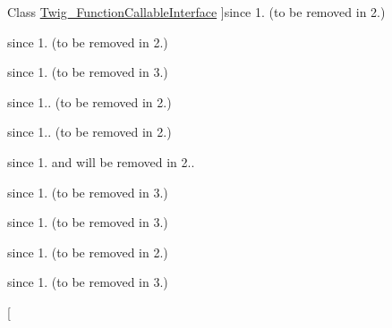 \begin{DoxyRefList}
Class \hyperlink{interfaceTwig__FunctionCallableInterface}{Twig\+\_\+\+Function\+Callable\+Interface} ]since 1. (to be removed in 2.)  
\item[\label{deprecated__deprecated000028}%
\hypertarget{deprecated__deprecated000028}{}%
Class \hyperlink{interfaceTwig__FunctionInterface}{Twig\+\_\+\+Function\+Interface} ]since 1. (to be removed in 2.)  
\item[\label{deprecated__deprecated000029}%
\hypertarget{deprecated__deprecated000029}{}%
Class \hyperlink{interfaceTwig__LexerInterface}{Twig\+\_\+\+Lexer\+Interface} ]since 1. (to be removed in 3.)  
\item[\label{deprecated__deprecated000030}%
\hypertarget{deprecated__deprecated000030}{}%
Class \hyperlink{classTwig__Loader__String}{Twig\+\_\+\+Loader\+\_\+\+String} ]since 1.. (to be removed in 2.) 
\item[\label{deprecated__deprecated000032}%
\hypertarget{deprecated__deprecated000032}{}%
Member \hyperlink{classTwig__Node_ae67364ef0be505ea43a05f6c80e1c7c6}{Twig\+\_\+\+Node\+:\+:to\+Xml} (\$as\+Dom=false)]since 1.. (to be removed in 2.)  
\item[\label{deprecated__deprecated000031}%
\hypertarget{deprecated__deprecated000031}{}%
Class \hyperlink{classTwig__Node__Expression__ExtensionReference}{Twig\+\_\+\+Node\+\_\+\+Expression\+\_\+\+Extension\+Reference} ]since 1. and will be removed in 2..  
\item[\label{deprecated__deprecated000033}%
\hypertarget{deprecated__deprecated000033}{}%
Class \hyperlink{interfaceTwig__NodeInterface}{Twig\+\_\+\+Node\+Interface} ]since 1. (to be removed in 3.)  
\item[\label{deprecated__deprecated000034}%
\hypertarget{deprecated__deprecated000034}{}%
Class \hyperlink{interfaceTwig__ParserInterface}{Twig\+\_\+\+Parser\+Interface} ]since 1. (to be removed in 3.)  
\item[\label{deprecated__deprecated000035}%
\hypertarget{deprecated__deprecated000035}{}%
Member \hyperlink{classTwig__Template_aa0d25ffa6b97f4669db9ee17fb8c3986}{Twig\+\_\+\+Template\+:\+:get\+Environment} ()]since 1. (to be removed in 2.)  
\item[\label{deprecated__deprecated000036}%
\hypertarget{deprecated__deprecated000036}{}%
Class \hyperlink{interfaceTwig__TemplateInterface}{Twig\+\_\+\+Template\+Interface} ]since 1. (to be removed in 3.)  
\item[\label{deprecated__deprecated000040}%

\end{DoxyRefList}
